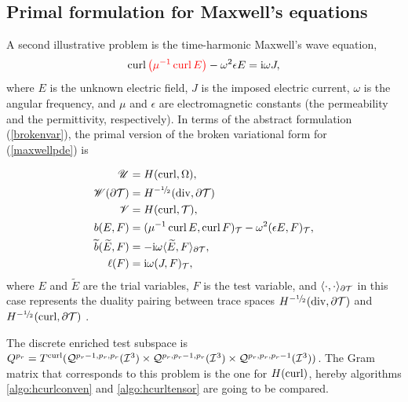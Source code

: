 \subsection{Primal formulation for Maxwell's equations}
% 
A second illustrative problem is the time-harmonic Maxwell's wave equation,
%
\begin{equation}
\operatorname{curl}{\color{red}{\left( \mu^{-1}\operatorname{curl}E \right)}} - \omega^2\epsilon E=\mathrm{i}\omega J,
\label{maxwellpde}
\end{equation}
% 
where $E$ is the unknown electric field, $J$ is the imposed electric current, $\omega$ is the {\color{blue} angular frequency, and $\mu$ and $\epsilon$ are electromagnetic constants (the permeability and the permittivity, respectively)}. In terms of the abstract formulation (\ref{brokenvar}), the primal version of the broken variational form for (\ref{maxwellpde}) is

\begin{equation}
\begin{aligned}
    \scU&=\HSo(\curl,\Omega),\\
    \scW(\partial\mesh)&=\HSo^{-\onehalf}(\div,\partial\mesh)\\
    \scV&=\HSo(\curl,\mesh),\\
    b(E,F)&=(\mu^{-1}\curl E,\curl F)_\mesh-\omega^2(\epsilon E,F)_\mesh,\\
    \tilde{b}(\tilde{E},F)&=-\zI\omega\langle\tilde{E},F\rangle_{\partial\mesh},\\
    \ell(F)&=\zI\omega(J,F)_\mesh,
\end{aligned}
\label{maxwellbrokenprimal}
\end{equation}
%
where $E$ and $\tilde{E}$ are the trial variables, $F$ is the test variable, and $\langle\cdot,\cdot \rangle_{\partial\mathcal{T}}$ in this case represents the duality pairing between trace spaces $\HSo^{-\onehalf}(\div,\partial\mesh)$ and $\HSo^{-\onehalf}(\curl,\partial\mesh)$ \cite{BrokenForms15}.

The discrete enriched test subspace is $Q^{p_r}=T^{\operatorname{curl}}(\mathcal{Q}^{p_r-1,p_r,p_r}(\mathcal{I}^3) \times\mathcal{Q}^{p_r,p_r-1,p_r}(\mathcal{I}^3) \times\mathcal{Q}^{p_r,p_r,p_r-1}(\mathcal{I}^3))$. The Gram matrix that corresponds to this problem is the one for $H(\operatorname{curl})$, hereby algorithms \ref{algo:hcurlconven} and \ref{algo:hcurltensor} are going to be compared.

